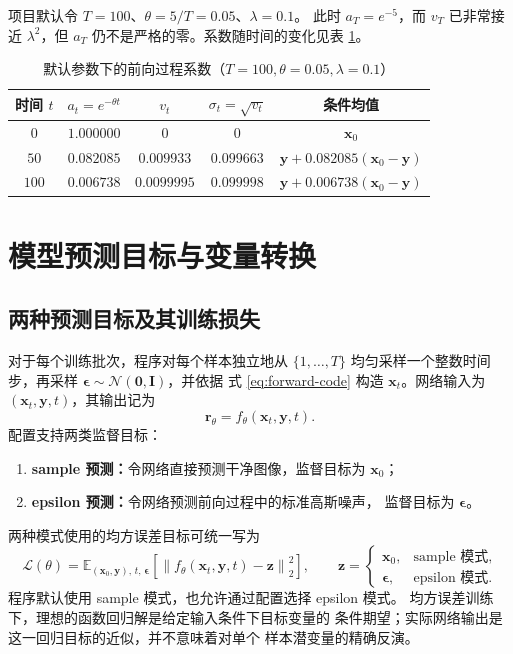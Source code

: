 \documentclass[UTF8,a4paper,12pt]{ctexart}
\begin{document}
项目默认令 \(T=100\)、\(\theta=5/T=0.05\)、\(\lambda=0.1\)。
此时 \(a_T=e^{-5}\)，而 \(v_T\) 已非常接近 \(\lambda^2\)，但
\(a_T\) 仍不是严格的零。系数随时间的变化见表
\ref{tab:schedule}。

\begin{table}[htbp]
\centering
\caption{默认参数下的前向过程系数（\(T=100,\theta=0.05,\lambda=0.1\)）}
\label{tab:schedule}
\begin{tabular}{ccccc}
\toprule
时间 \(t\) & \(a_t=e^{-\theta t}\) & \(v_t\) & \(\sigma_t=\sqrt{v_t}\)
& 条件均值 \\
\midrule
\(0\) & \(1.000000\) & \(0\) & \(0\)
& \(\bm{x}_0\) \\
\(50\) & \(0.082085\) & \(0.009933\) & \(0.099663\)
& \(\bm{y}+0.082085(\bm{x}_0-\bm{y})\) \\
\(100\) & \(0.006738\) & \(0.0099995\) & \(0.099998\)
& \(\bm{y}+0.006738(\bm{x}_0-\bm{y})\) \\
\bottomrule
\end{tabular}
\end{table}

\section{模型预测目标与变量转换}

\subsection{两种预测目标及其训练损失}

对于每个训练批次，程序对每个样本独立地从
\(\{1,\ldots,T\}\) 均匀采样一个整数时间步，再采样
\(\bm{\epsilon}\sim\mathcal{N}(\bm{0},\bm{I})\)，并依据
式 \eqref{eq:forward-code} 构造 \(\bm{x}_t\)。网络输入为
\((\bm{x}_t,\bm{y},t)\)，其输出记为
\[
  \bm{r}_\theta=f_\theta(\bm{x}_t,\bm{y},t).
\]
配置支持两类监督目标：

\begin{enumerate}[label=(\arabic*)]
  \item \textbf{sample 预测：}令网络直接预测干净图像，监督目标为
  \(\bm{x}_0\)；
  \item \textbf{epsilon 预测：}令网络预测前向过程中的标准高斯噪声，
  监督目标为 \(\bm{\epsilon}\)。
\end{enumerate}

两种模式使用的均方误差目标可统一写为
\begin{equation}
  \mathcal{L}(\theta)
  =
  \mathbb{E}_{(\bm{x}_0,\bm{y}),\,t,\,\bm{\epsilon}}
  \left[
    \left\|
      f_\theta(\bm{x}_t,\bm{y},t)-\bm{z}
    \right\|_2^2
  \right],
  \qquad
  \bm{z}=
  \begin{cases}
    \bm{x}_0, & \text{sample 模式},\\
    \bm{\epsilon}, & \text{epsilon 模式}.
  \end{cases}
  \label{eq:loss}
\end{equation}
程序默认使用 sample 模式，也允许通过配置选择 epsilon 模式。
均方误差训练下，理想的函数回归解是给定输入条件下目标变量的
条件期望；实际网络输出是这一回归目标的近似，并不意味着对单个
样本潜变量的精确反演。
\end{document}
